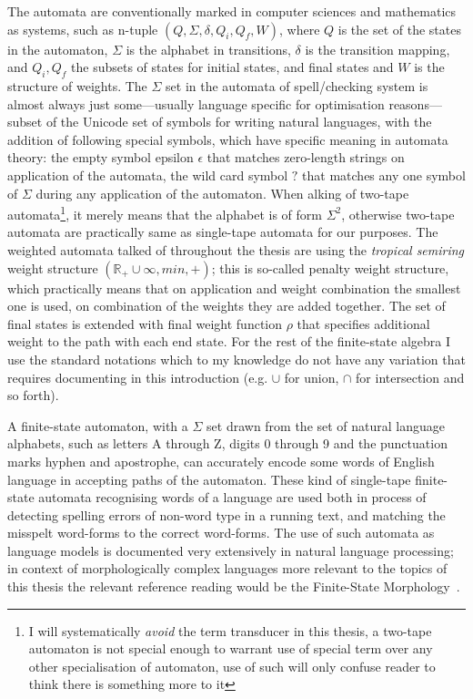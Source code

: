 \documentclass[officiallayout]{unihelcompling}
\begin{document}
The automata are conventionally marked in computer sciences and mathematics as
systems, such as n-tuple $(Q, \Sigma, \delta, Q_i, Q_f, W)$, where $Q$ is the
set of the states in the automaton, $\Sigma$ is the alphabet in transitions,
$\delta$ is the transition mapping, and $Q_i, Q_f$ the subsets of states for
initial states, and final states and $W$ is the structure of weights. The
$\Sigma$ set in the automata of spell\-/checking system is almost always just
some---usually language specific for optimisation reasons---subset of the
Unicode set of symbols for writing natural languages, with the addition of
following special symbols, which have specific meaning in automata theory: the
empty symbol epsilon $\epsilon$ that matches zero-length strings on application
of the automata, the wild card symbol $?$ that matches any one symbol of
$\Sigma$ during any application of the automaton.  When alking of two-tape
automata\footnote{I will systematically \emph{avoid} the term transducer in
this thesis, a two-tape automaton is not special enough to warrant use of
special term over any other specialisation of automaton, use of such will only
confuse reader to think there is something more to it}, it merely means that
the alphabet is of form $\Sigma^2$, otherwise two-tape automata are practically
same as single-tape automata for our purposes. The weighted automata talked of
throughout the thesis are using the \emph{tropical semiring} weight structure
$(\mathbb{R}_+ \cup \infty, min, +)$; this is so-called penalty weight
structure, which practically means that on application and weight combination
the smallest one is used, on combination of the weights they are added
together. The set of final states is extended with final weight function $\rho$
that specifies additional weight to the path with each end state. For the rest
of the finite-state algebra I use the standard notations which to my knowledge
do not have any variation that requires documenting in this introduction (e.g.
$\cup$ for union, $\cap$ for intersection and so forth).

A finite-state automaton, with a $\Sigma$ set drawn from the set of natural
language alphabets, such as letters A through Z, digits 0 through 9 and the
punctuation marks hyphen and apostrophe, can accurately encode some words of
English language in accepting paths of the automaton. These kind of single-tape
finite-state automata recognising words of a language are used both in process
of detecting spelling errors of non-word type in a running text, and matching
the misspelt word-forms to the correct word-forms. The use of such automata as
language models is documented very extensively in natural language processing;
in context of morphologically complex languages more relevant to the topics of
this thesis the relevant reference reading would be the Finite-State Morphology~\citep{beesley2003finite,beesley2004morphological}.
\end{document}
